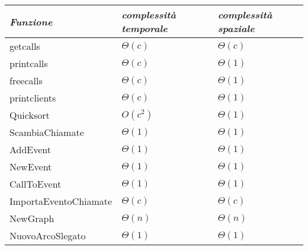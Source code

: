 \documentclass[a4paper,11pt]{Article}
\newcommand\T{\rule{0pt}{2.6ex}}       %
\newcommand\B{\rule[-1.2ex]{0pt}{0pt}} %
\begin{document}
\begin{tabular}{p{3.8cm}p{4cm}p{4cm}}

\textit{Funzione} & \textit{complessità temporale} & \textit{complessità spaziale} \B\\
\hline
getcalls                        & $\Theta(c)$                     & $\Theta(c)$ \T\\
printcalls                      & $\Theta(c)$                     & $\Theta(1)$ \T\\
freecalls                       & $\Theta(c)$                     & $\Theta(1)$ \T\\
printclients                    & $\Theta(c)$                     & $\Theta(1)$ \T\\
Quicksort                       & $O(c^2)$                        & $\Theta(1)$ \T\\
ScambiaChiamate                 & $\Theta(1)$                     & $\Theta(1)$ \T\\
AddEvent                        & $\Theta(1)$                     & $\Theta(1)$ \T\\
NewEvent                        & $\Theta(1)$                     & $\Theta(1)$ \T\\
CallToEvent\footnotemark        & $\Theta(1)$                     & $\Theta(1)$ \T\\
ImportaEventoChiamate           & $\Theta(c)$                     & $\Theta(c)$ \T\\
NewGraph                        & $\Theta(n)$                     & $\Theta(n)$ \T\\
NuovoArcoSlegato                & $\Theta(1)$                     & $\Theta(1)$ \T\\
\end{tabular}

\end{document}
